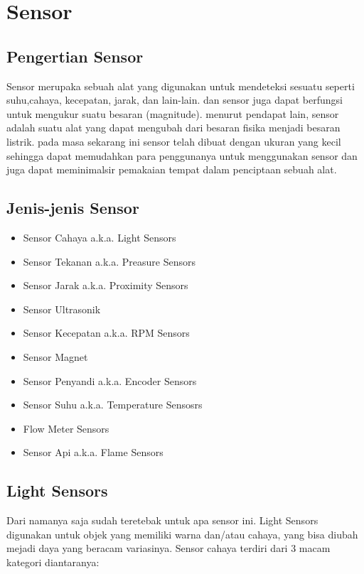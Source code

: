 \section {Sensor}

\subsection{Pengertian Sensor}

Sensor merupaka sebuah alat yang digunakan untuk mendeteksi sesuatu seperti suhu,cahaya, kecepatan, jarak, dan lain-lain. dan sensor juga dapat berfungsi untuk 
mengukur suatu besaran (magnitude). menurut pendapat lain, sensor adalah suatu alat yang dapat mengubah dari besaran fisika menjadi besaran listrik. pada masa sekarang ini sensor telah dibuat dengan ukuran yang kecil sehingga dapat memudahkan para penggunanya untuk menggunakan sensor dan juga dapat meminimalsir pemakaian tempat dalam penciptaan sebuah alat.


\subsection{Jenis-jenis Sensor}
	\begin{itemize}
	\item Sensor Cahaya a.k.a. Light Sensors
	\item Sensor Tekanan a.k.a. Preasure Sensors
	\item Sensor Jarak a.k.a. Proximity Sensors
	\item Sensor Ultrasonik
	\item Sensor Kecepatan a.k.a. RPM Sensors
	\item Sensor Magnet
	\item Sensor Penyandi a.k.a. Encoder Sensors
	\item Sensor Suhu a.k.a. Temperature Sensosrs
	\item Flow Meter Sensors
	\item Sensor Api a.k.a. Flame Sensors
	\end{itemize}

\subsection{Light Sensors}
Dari namanya saja sudah teretebak untuk apa sensor ini. Light Sensors digunakan untuk objek yang memiliki warna dan/atau cahaya, yang bisa diubah mejadi daya yang beracam variasinya. Sensor cahaya terdiri dari 3 macam kategori diantaranya:

